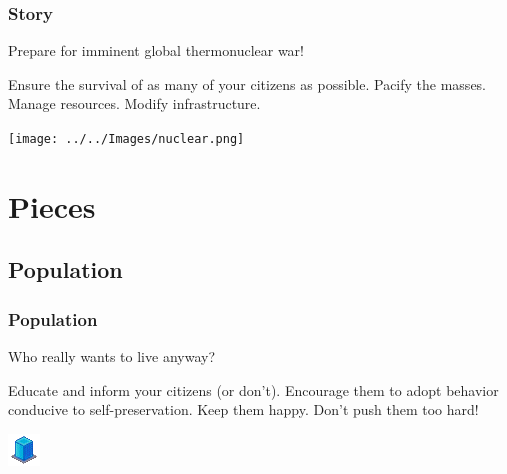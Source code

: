 \documentclass[ascpectratio=169]{beamer}
\begin{document}
\begin{frame}

  \frametitle{Story}

  \begin{center}
    {\Large Prepare for imminent global thermonuclear war!}
  \end{center}

  \begin{outline}
    \1 Ensure the survival of as many of your citizens as possible.
    \1 Pacify the masses.
    \1 Manage resources.
    \1 Modify infrastructure.
  \end{outline}

  \begin{center}
    \texttt{[image: ../../Images/nuclear.png]}
  \end{center}

\end{frame}


\section{Pieces}

\subsection{Population}


\begin{frame}

  \frametitle{Population}

  \begin{center}
    {\large Who really wants to live anyway?}
  \end{center}

  \begin{outline}
    \1 Educate and inform your citizens (or don't).
    \1 Encourage them to adopt behavior conducive to self-preservation.
    \1 Keep them happy.
    \1 Don't push them too hard!
  \end{outline}

  \begin{center}
    \includegraphics[scale=2.0]{../../Images/flats.png}
  \end{center}

\end{frame}
\end{document}
